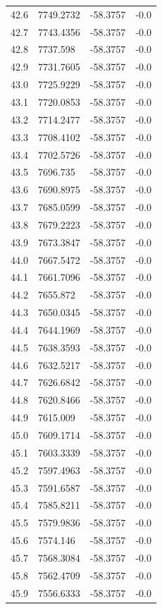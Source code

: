 \begin{table}[H]
\begin{tabular}{llll}
42.6 & 7749.2732 & -58.3757 & -0.0 \\
42.7 & 7743.4356 & -58.3757 & -0.0 \\
42.8 & 7737.598 & -58.3757 & -0.0 \\
42.9 & 7731.7605 & -58.3757 & -0.0 \\
43.0 & 7725.9229 & -58.3757 & -0.0 \\
43.1 & 7720.0853 & -58.3757 & -0.0 \\
43.2 & 7714.2477 & -58.3757 & -0.0 \\
43.3 & 7708.4102 & -58.3757 & -0.0 \\
43.4 & 7702.5726 & -58.3757 & -0.0 \\
43.5 & 7696.735 & -58.3757 & -0.0 \\
43.6 & 7690.8975 & -58.3757 & -0.0 \\
43.7 & 7685.0599 & -58.3757 & -0.0 \\
43.8 & 7679.2223 & -58.3757 & -0.0 \\
43.9 & 7673.3847 & -58.3757 & -0.0 \\
44.0 & 7667.5472 & -58.3757 & -0.0 \\
44.1 & 7661.7096 & -58.3757 & -0.0 \\
44.2 & 7655.872 & -58.3757 & -0.0 \\
44.3 & 7650.0345 & -58.3757 & -0.0 \\
44.4 & 7644.1969 & -58.3757 & -0.0 \\
44.5 & 7638.3593 & -58.3757 & -0.0 \\
44.6 & 7632.5217 & -58.3757 & -0.0 \\
44.7 & 7626.6842 & -58.3757 & -0.0 \\
44.8 & 7620.8466 & -58.3757 & -0.0 \\
44.9 & 7615.009 & -58.3757 & -0.0 \\
45.0 & 7609.1714 & -58.3757 & -0.0 \\
45.1 & 7603.3339 & -58.3757 & -0.0 \\
45.2 & 7597.4963 & -58.3757 & -0.0 \\
45.3 & 7591.6587 & -58.3757 & -0.0 \\
45.4 & 7585.8211 & -58.3757 & -0.0 \\
45.5 & 7579.9836 & -58.3757 & -0.0 \\
45.6 & 7574.146 & -58.3757 & -0.0 \\
45.7 & 7568.3084 & -58.3757 & -0.0 \\
45.8 & 7562.4709 & -58.3757 & -0.0 \\
45.9 & 7556.6333 & -58.3757 & -0.0 \\

\end{tabular}
\end{table}
